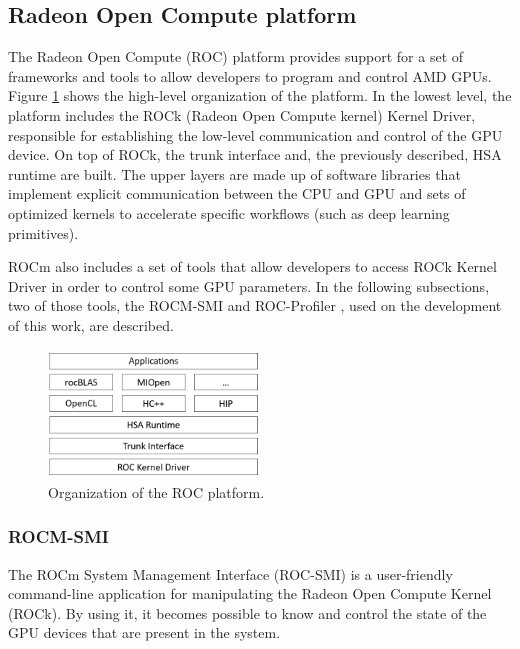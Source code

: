 \subsection{Radeon Open Compute platform}

The Radeon Open Compute (ROC) \cite{noauthor_radeonopencompute/rocm_2019} platform provides support for a set of frameworks and tools to allow developers to program and control AMD GPUs. Figure \ref{fig:rocmplatform} shows the high-level organization of the platform. In the lowest level, the platform includes the ROCk (Radeon Open Compute kernel) Kernel Driver,  responsible for establishing the low-level communication and control of the GPU device. On top of ROCk, the trunk interface and, the previously described, HSA runtime are built. The upper layers are made up of software libraries that implement explicit communication between the CPU and GPU and sets of optimized kernels to accelerate specific workflows (such as deep learning primitives).

ROCm also includes a set of tools that allow developers to access  ROCk Kernel Driver in order to control some GPU parameters. In the following subsections, two of those tools, the ROCM-SMI \cite{noauthor_radeonopencompute/roc-smi_2019} and ROC-Profiler \cite{noauthor_rocm-developer-tools/rocprofiler_2019}, used on the development of this work, are described.

\begin{figure}[!htb]
  \centering
  \includegraphics[width=0.5\textwidth]{Figures/StateArt/rocStack.png}
  \caption{Organization of the ROC platform.}
  \label{fig:rocmplatform}
\end{figure}

\subsubsection{ROCM-SMI}
The ROCm System Management Interface (ROC-SMI) \cite{noauthor_radeonopencompute/roc-smi_2019} is a user-friendly command-line application for manipulating the Radeon Open Compute Kernel (ROCk). By using it, it becomes possible to know and control the state of the GPU devices that are present in the system. 

